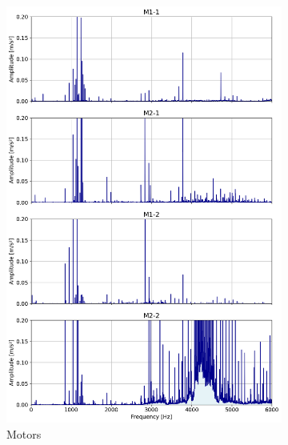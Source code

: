 \documentclass{llncs}
\begin{document}
\begin{figure}
\begin{subfigure}[b]{0.3\textwidth}
         \includegraphics[width=\textwidth]{fig/spectrum/motor-wideband-60s.png}
         \caption{Motors}
         \label{fig:motor-wideband}
     \end{subfigure}
     \hfill
     \begin{subfigure}[b]{0.3\textwidth}
         \centering

\end{subfigure}
\end{figure}
\end{document}
